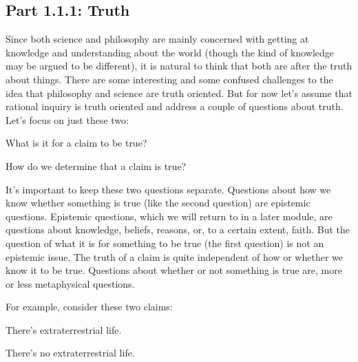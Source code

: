 \subsection{Part 1.1.1: Truth}
\label{s:p1.1.1}
Since both science and philosophy are mainly concerned with getting at knowledge and understanding about the world (though the kind of knowledge may be argued to be different), it is natural to think that both are after the truth about things. There are some interesting and some confused challenges to the idea that philosophy and science are truth oriented. But for now let’s assume that rational inquiry is truth oriented and address a couple of questions about truth. Let’s focus on just these two:
\begin{earg}
    \item[\ex{truth1}] What is it for a claim to be true?
    \item[\ex{truth2}] How do we determine that a claim is true?
\end{earg}
It’s important to keep these two questions separate. Questions about how we know whether something is true (like the second question) are epistemic questions. Epistemic questions, which we will return to in a later module, are questions about knowledge, beliefs, reasons, or, to a certain extent, faith. But the question of what it is for something to be true (the first question) is not an epistemic issue. The truth of a claim is quite independent of how or whether we know it to be true. Questions about whether or not something is true are, more or less metaphysical questions.

For example, consider these two claims:

\begin{earg}
    \item[] There's extraterrestrial life.
    \item[] There's no extraterrestrial life. 
\end{earg}


